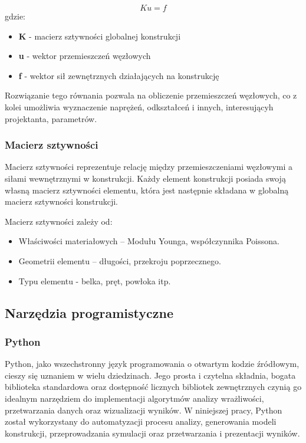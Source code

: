 \begin{equation}
    Ku = f
\end{equation}
gdzie:

\begin{itemize}
    \item \textbf{K} - macierz sztywności globalnej konstrukcji
    \item \textbf{u} - wektor przemieszczeń węzłowych
    \item \textbf{f} - wektor sił zewnętrznych działających na konstrukcję
\end{itemize}

Rozwiązanie tego równania pozwala na obliczenie przemieszczeń węzłowych, co z kolei umożliwia wyznaczenie naprężeń, odkształceń i innych, interesującyh projektanta, parametrów.

\subsubsection*{Macierz sztywności}

Macierz sztywności reprezentuje relację między przemieszczeniami węzłowymi a siłami wewnętrznymi w konstrukcji.
Każdy element konstrukcji posiada swoją własną macierz sztywności elementu, która jest następnie składana w globalną macierz sztywności konstrukcji.

Macierz sztywności zależy od:

\begin{itemize}
    \item Właściwości materiałowych – Modułu Younga, współczynnika Poissona.
    \item Geometrii elementu – długości, przekroju poprzecznego.
    \item Typu elementu - belka, pręt, powłoka itp.
\end{itemize}

\subsection{Narzędzia programistyczne}
\subsubsection{Python}

Python, jako wszechstronny język programowania o otwartym kodzie źródłowym, cieszy się uznaniem w wielu dziedzinach\cite{python}.
Jego prosta i czytelna składnia, bogata biblioteka standardowa oraz dostępność licznych bibliotek zewnętrznych czynią go idealnym narzędziem do implementacji algorytmów analizy wrażliwości, przetwarzania danych oraz wizualizacji wyników.
W niniejszej pracy, Python został wykorzystany do automatyzacji procesu analizy, generowania modeli konstrukcji, przeprowadzania symulacji oraz przetwarzania i prezentacji wyników.

